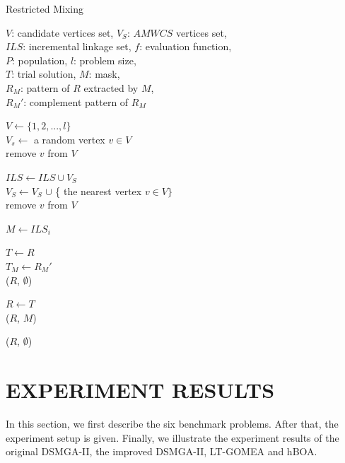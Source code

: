 \documentclass{sig-alternate-05-2015}
\begin{document}
\begin{algorithm}
\caption{Restricted Mixing}\label{algo_disjdecomp}

$V$: candidate vertices set, $V_S$: $AMWCS$ vertices set,  \\
$ILS$: incremental linkage set, $f$: evaluation function, \\
$P$: population, $l$: problem size, \\
$T$: trial solution, $M$: mask, \\
${R_M}$: pattern of $R$ extracted by $M$, \\
${R_M}'$: complement pattern of ${R_M}$


\BlankLine
$V \leftarrow \{ 1, 2, ..., l \}$ \\
$V_s \leftarrow$ a random vertex $v \in V$ \\
remove $v$ from $V$ \\

 {

    $ILS \leftarrow ILS \cup V_{S}$ \\
    $V_S \leftarrow V_S$ $\cup$ \{ the nearest vertex $v \in V \}$ \\
    remove $v$ from $V$ \\
}

\BlankLine
{} {

    $M \leftarrow ILS_i$ \\

     {

        $T \leftarrow R$ \\
        $T_M \leftarrow {R_M}'$ \\

         {
            \Return ($R$, $\emptyset$) 
        }

         {
            $R \leftarrow T$ \\
            \Return ($R$, $M$)
        }
    }
}
\Return ($R$, $\emptyset$) 
\end{algorithm}




\section{EXPERIMENT RESULTS}
In this section, we first describe the six benchmark problems. After that, the experiment setup is given. Finally, we illustrate the experiment results of the original DSMGA-II, the improved DSMGA-II, LT-GOMEA and hBOA. 
\end{document}
